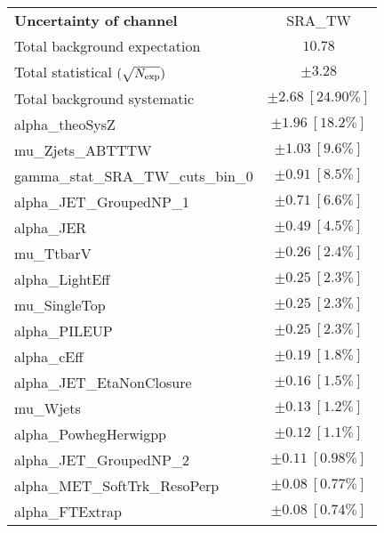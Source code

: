 
\begin{table}
\begin{center}
\setlength{\tabcolsep}{0.0pc}
\begin{tabular*}{\textwidth}{@{\extracolsep{\fill}}lc}
\noalign{\smallskip}\hline\noalign{\smallskip}
{\bf Uncertainty of channel}                                    & SRA\_TW            \\
\noalign{\smallskip}\hline\noalign{\smallskip}
Total background expectation             &  $10.78$       \\
\noalign{\smallskip}\hline\noalign{\smallskip}
Total statistical $(\sqrt{N_{\rm exp}})$              & $\pm 3.28$       \\
Total background systematic               & $\pm 2.68\ [24.90\%] $             \\
\noalign{\smallskip}\hline\noalign{\smallskip}
\noalign{\smallskip}\hline\noalign{\smallskip}
alpha\_theoSysZ         & $\pm 1.96\ [18.2\%] $       \\
mu\_Zjets\_ABTTTW         & $\pm 1.03\ [9.6\%] $       \\
gamma\_stat\_SRA\_TW\_cuts\_bin\_0         & $\pm 0.91\ [8.5\%] $       \\
alpha\_JET\_GroupedNP\_1         & $\pm 0.71\ [6.6\%] $       \\
alpha\_JER         & $\pm 0.49\ [4.5\%] $       \\
mu\_TtbarV         & $\pm 0.26\ [2.4\%] $       \\
alpha\_LightEff         & $\pm 0.25\ [2.3\%] $       \\
mu\_SingleTop         & $\pm 0.25\ [2.3\%] $       \\
alpha\_PILEUP         & $\pm 0.25\ [2.3\%] $       \\
alpha\_cEff         & $\pm 0.19\ [1.8\%] $       \\
alpha\_JET\_EtaNonClosure         & $\pm 0.16\ [1.5\%] $       \\
mu\_Wjets         & $\pm 0.13\ [1.2\%] $       \\
alpha\_PowhegHerwigpp         & $\pm 0.12\ [1.1\%] $       \\
alpha\_JET\_GroupedNP\_2         & $\pm 0.11\ [0.98\%] $       \\
alpha\_MET\_SoftTrk\_ResoPerp         & $\pm 0.08\ [0.77\%] $       \\
alpha\_FTExtrap         & $\pm 0.08\ [0.74\%] $       \\

\end{tabular*}
\end{center}
\end{table}
